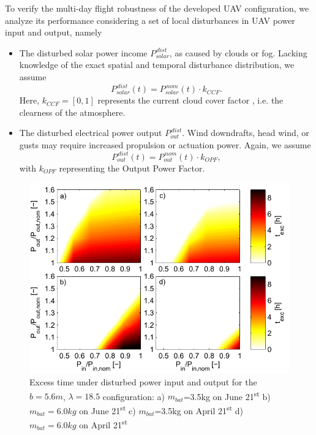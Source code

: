 To verify the multi-day flight robustness of the developed UAV configuration, we analyze its performance considering a set of local disturbances in UAV power input and output, namely
\begin{itemize}
\item The disturbed solar power income $P_{solar}^{\,dist}$, as caused by clouds or fog. Lacking knowledge of the exact spatial and temporal disturbance distribution, we assume
\begin{equation}
P_{solar}^{\,dist}(t) = P_{solar}^{\,nom}(t) \cdot k_{CCF}.
\end{equation}
Here, $k_{CCF}=[0,1]$  represents the current cloud cover factor \cite{Kimura_SolarRadAndClouds}, i.e. the clearness of the atmosphere.
\item The disturbed electrical power output $P_{out}^{\,dist}$. Wind downdrafts, head wind, or gusts may require increased propulsion or actuation power. Again, we assume 
\begin{equation}
P_{out}^{\,dist}(t) = P_{out}^{\,nom}(t) \cdot k_{OPF},
\end{equation}
with $k_{OPF}$ representing the Output Power Factor.
\end{itemize}
\begin{figure}
    \centering
    \includegraphics[width=\linewidth]{images/5_texcRobustness/5_texcRobustness.pdf}
    \caption{Excess time under disturbed power input and output for the $b=5.6m$, $\lambda=18.5$ configuration: a) $m_{bat}$=3.5kg on June 21\textsuperscript{st} b) $m_{bat}=6.0kg$ on June 21\textsuperscript{st} c) $m_{bat}$=3.5kg on April 21\textsuperscript{st} d) $m_{bat}=6.0kg$ on April 21\textsuperscript{st} }
    \label{fig:ExcessTimeRobustness}
\end{figure}
